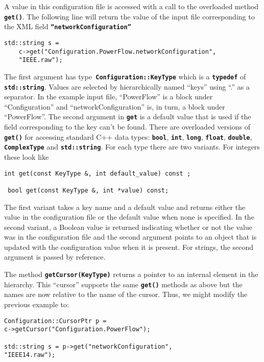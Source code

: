 A value in this configuration file is accessed with a call to the overloaded method \texttt{\textbf{get()}}. The following line will return the value of the input file corresponding to the XML field \texttt{\textbf{``networkConfiguration''}}

{
\color{red}
\begin{Verbatim}[fontseries=b]
std::string s = 
    c->get("Configuration.PowerFlow.networkConfiguration",  
    "IEEE.raw");
\end{Verbatim}
}

The first argument has type\texttt{\textbf{ Configuration::KeyType}} which is a \texttt{\textbf{typedef}} of \texttt{\textbf{std::string}}. Values are selected by hierarchically named ``keys'' using ``.'' as a separator. In the example input file, ``PowerFlow'' is a block under ``Configuration'' and ``networkConfiguration'' is, in turn, a block under ``PowerFlow''. The second argument in \texttt{\textbf{get}} is a default value that is used if the field corresponding to the key can't be found. There are overloaded versions of \texttt{\textbf{get()}} for accessing standard C++ data types: \texttt{\textbf{bool}}, \texttt{\textbf{int}}, \texttt{\textbf{long}}, \texttt{\textbf{float}}, \texttt{\textbf{double}}, \texttt{\textbf{ComplexType}} and \texttt{\textbf{std::string}}. For each type there are two variants. For integers these look like 

{
\color{red}
\begin{Verbatim}[fontseries=b]
 int get(const KeyType &, int default_value) const ;

 bool get(const KeyType &, int *value) const;
\end{Verbatim}
}

The first variant takes a key name and a default value and returns either the value in the configuration file or the default value when none is specified. In the second variant, a Boolean value is returned indicating whether or not the value was in the configuration file and the second argument points to an object that is updated with the configuration value when it is present.  For strings, the second argument is passed by reference.  

The method \texttt{\textbf{getCursor(KeyType)}} returns a pointer to an internal element in the hierarchy. This ``cursor'' supports the same \texttt{\textbf{get()}} methods as above but the names are now relative to the name of the  cursor. Thus, we might modify the previous example to:

{
\color{red}
\begin{Verbatim}[fontseries=b]
Configuration::CursorPtr p = 
c->getCursor("Configuration.PowerFlow");

std::string s = p->get("networkConfiguration", 
"IEEE14.raw");
\end{Verbatim}
}


